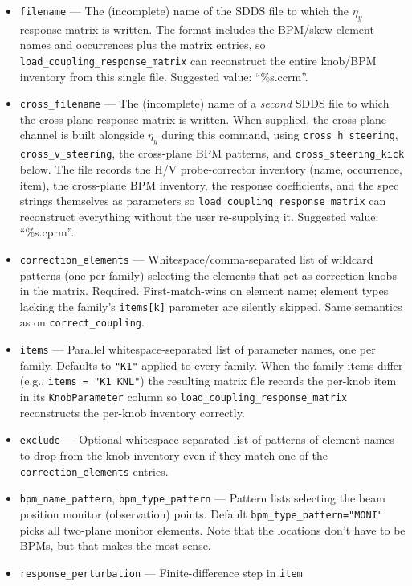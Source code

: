 \documentclass[11pt]{article}
\begin{document}
\begin{itemize}
\item \verb|filename| --- The (incomplete) name of the SDDS file to which the
  $\eta_y$ response matrix is written.  The format includes the BPM/skew element names
  and occurrences plus the matrix entries, so \verb|load_coupling_response_matrix|
  can reconstruct the entire knob/BPM inventory from this single file.
  Suggested value: ``\%s.ccrm''.
\item \verb|cross_filename| --- The (incomplete) name of a {\em second} SDDS
  file to which the cross-plane response matrix is written.  When supplied,
  the cross-plane channel is built alongside $\eta_y$ during this command,
  using \verb|cross_h_steering|, \verb|cross_v_steering|, the cross-plane BPM
  patterns, and \verb|cross_steering_kick| below.  The file records the H/V
  probe-corrector inventory (name, occurrence, item), the cross-plane BPM
  inventory, the response coefficients, and the spec strings themselves as
  parameters so \verb|load_coupling_response_matrix| can reconstruct
  everything without the user re-supplying it.  Suggested value: ``\%s.cprm''.
\item \verb|correction_elements| --- Whitespace/comma-separated list of
  wildcard patterns (one per family) selecting the elements that act as
  correction knobs in the matrix.  Required.  First-match-wins on element
  name; element types lacking the family's \verb|items[k]| parameter are
  silently skipped.  Same semantics as on \verb|correct_coupling|.
\item \verb|items| --- Parallel whitespace-separated list of parameter names,
  one per family.  Defaults to \verb|"K1"| applied to every family.  When the
  family items differ (e.g., \verb|items = "K1 KNL"|) the resulting matrix
  file records the per-knob item in its \verb|KnobParameter| column so
  \verb|load_coupling_response_matrix| reconstructs the per-knob inventory
  correctly.
\item \verb|exclude| --- Optional whitespace-separated list of patterns of
  element names to drop from the knob inventory even if they match one of the
  \verb|correction_elements| entries.
\item \verb|bpm_name_pattern|, \verb|bpm_type_pattern| --- Pattern lists
  selecting the beam position monitor (observation) points.  Default
  \verb|bpm_type_pattern="MONI"| picks all two-plane monitor elements.
  Note that the locations don't have to be BPMs, but that makes the most sense.
\item \verb|response_perturbation| --- Finite-difference step in \verb|item|

\end{itemize}
\end{document}
